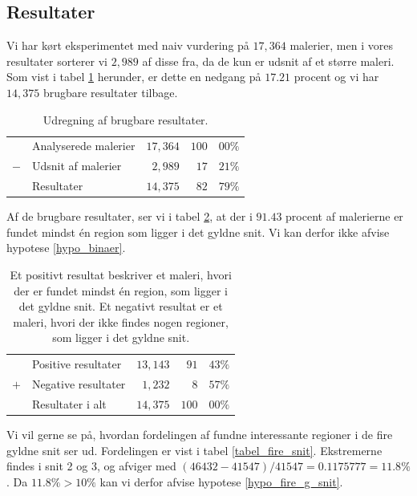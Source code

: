 {\clearpage

\subsection{Resultater}
Vi har kørt eksperimentet med naiv vurdering på $17,364$ malerier, men i
vores resultater sorterer vi $2,989$ af disse fra, da de kun er udsnit
af et større maleri.  Som vist i tabel \ref{tabel_fjern_detaljer}
herunder, er dette en nedgang på $17.21$ procent og vi har $14,375$
brugbare resultater tilbage.

\begin{table}[H]
    \centering
    \begin{tabular}{r@{\ \ }p{12em}r|r@{.}l}
            & Analyserede malerier & $17,364$ & $100$ & $00\%$   \\
        $-$ & Udsnit af malerier   &  $2,989$ &  $17$ & $21\%$   \\\hline
            & Resultater           & $14,375$ &  $82$ & $79\%$
    \end{tabular}
    \caption[]{Udregning af brugbare resultater.}
    \label{tabel_fjern_detaljer}
\end{table}

Af de brugbare resultater, ser vi i tabel \ref{tabel_fordeling}, at der
i $91.43$ procent af malerierne er fundet mindst én region som ligger i
det gyldne snit. Vi kan derfor ikke afvise hypotese \ref{hypo_binaer}.

\begin{table}[H]
    \centering
    \begin{tabular}{r@{\ \ }p{12em}r|r@{.}l}
            & Positive resultater   & $13,143$ &  $91$ & $43\%$ \\
        $+$ & Negative resultater   &  $1,232$ &   $8$ & $57\%$ \\\hline
            & Resultater i alt      & $14,375$ & $100$ & $00\%$
    \end{tabular}
    \caption[]{Et positivt resultat beskriver et maleri, hvori der er
    fundet mindst én region, som ligger i det gyldne snit. Et negativt
    resultat er et maleri, hvori der ikke findes nogen regioner, som
    ligger i det gyldne snit.}
    \label{tabel_fordeling}
\end{table}

Vi vil gerne se på, hvordan fordelingen af fundne interessante regioner
i de fire gyldne snit ser ud. Fordelingen er vist i tabel
\ref{tabel_fire_snit}. Ekstremerne findes i snit 2 og 3, og afviger med
$(46432-41547)/41547 = 0.1175777 = 11.8 \%$. Da $11.8 \% > 10 \%$
kan vi derfor afvise hypotese \ref{hypo_fire_g_snit}.

}
